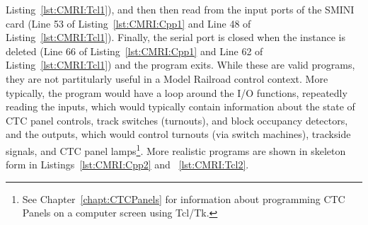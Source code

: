 Listing~\ref{lst:CMRI:Tcl1}), and then then read from the input ports
of the SMINI card (Line 53 of Listing~\ref{lst:CMRI:Cpp1} and Line 48
of Listing~\ref{lst:CMRI:Tcl1}). Finally, the serial port is closed
when the instance is deleted (Line 66 of Listing~\ref{lst:CMRI:Cpp1}
and Line 62 of Listing~\ref{lst:CMRI:Tcl1}) and the program exits.
While these are valid programs, they are not partitularly useful in a
Model Railroad control context.  More typically, the program would have
a loop around the I/O functions, repeatedly reading the inputs, which
would typically contain information about the state of CTC panel
controls, track switches (turnouts), and block occupancy detectors, and
the outputs, which would control turnouts (via switch machines),
trackside signals, and CTC panel lamps\footnote{See
Chapter~\ref{chapt:CTCPanels} for information about programming CTC
Panels on a computer screen using Tcl/Tk.}.  More realistic programs
are shown in skeleton form in Listings~\ref{lst:CMRI:Cpp2} and
~\ref{lst:CMRI:Tcl2}.

